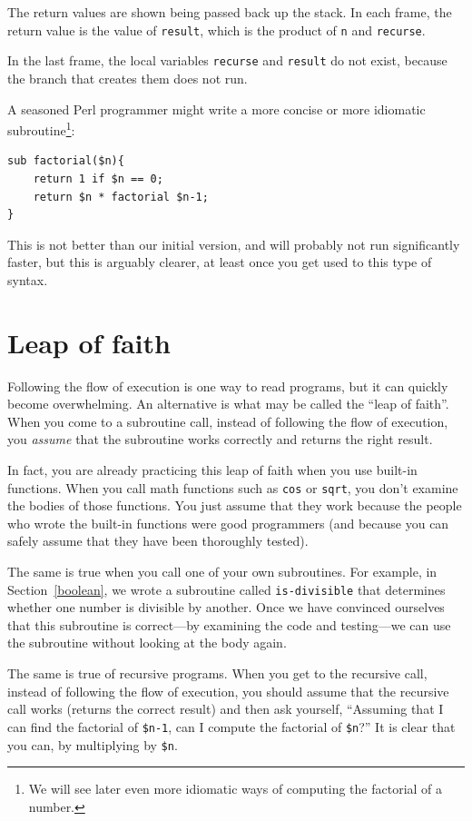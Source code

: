 The return values are shown being passed back up the stack.  In each
frame, the return value is the value of {\tt result}, which is the
product of {\tt n} and {\tt recurse}.

In the last frame, the local
variables {\tt recurse} and {\tt result} do not exist, because
the branch that creates them does not run.

A seasoned Perl programmer might write a more concise or
more idiomatic subroutine\footnote{We will see later even 
more idiomatic ways of computing the factorial of a number.}:

\begin{verbatim}
sub factorial($n){
    return 1 if $n == 0;
    return $n * factorial $n-1;
}
\end{verbatim}
%
This is not better than our initial version, and will probably 
not run significantly faster, but this is arguably clearer, 
at least once you get used to this type of syntax.

\section{Leap of faith}

Following the flow of execution is one way to read programs, but
it can quickly become overwhelming.  An alternative is what may 
be called the ``leap of faith''.  When you come to a
subroutine call, instead of following the flow of execution, you {\em
assume} that the subroutine works correctly and returns the right
result.

In fact, you are already practicing this leap of faith when you use
built-in functions.  When you call math functions such as {\tt cos} or {\tt sqrt},
you don't examine the bodies of those functions.  You just
assume that they work because the people who wrote the built-in
functions were good programmers (and because you can safely 
assume that they have been thoroughly tested).

The same is true when you call one of your own subroutines.  For
example, in Section~\ref{boolean}, we wrote a subroutine called 
\verb"is-divisible" that determines whether one number is divisible by
another.  Once we have convinced ourselves that this subroutine is
correct---by examining the code and testing---we can use the subroutine without looking at the body again.

The same is true of recursive programs.  When you get to the recursive
call, instead of following the flow of execution, you should assume
that the recursive call works (returns the correct result) and then ask
yourself, ``Assuming that I can find the factorial of \verb"$n-1", can I
compute the factorial of \verb"$n"?''  It is clear that you
can, by multiplying by \verb"$n".

